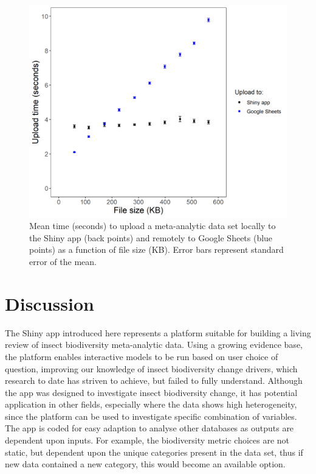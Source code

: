 \documentclass[11pt]{article}
\begin{document}
		\begin{figure}[H] 
			\centering 
			\includegraphics[scale=1]{figure_6_upload_data_time_graph.png} 
			\caption{Mean time (seconds) to upload a meta-analytic data set locally to the Shiny app (back points) and remotely to Google Sheets (blue points) as a function of file size (KB). Error bars represent standard error of the mean.}  
		\end{figure}
		
		\clearpage
		
		\section{Discussion}
		The Shiny app introduced here represents a platform suitable for building a living review of insect biodiversity meta-analytic data. Using a growing evidence base, the platform enables interactive models to be run based on user choice of question, improving our knowledge of insect biodiversity change drivers, which research to date has striven to achieve, but failed to fully understand. Although the app was designed to investigate insect biodiversity change, it has potential application in other fields, especially where the data shows high heterogeneity, since the platform can be used to investigate specific combination of variables. The app is coded for easy adaption to analyse other databases as outputs are dependent upon inputs. For example, the biodiversity metric choices are not static, but dependent upon the unique categories present in the data set, thus if new data contained a new category, this would become an available option.  
		
\end{document}
